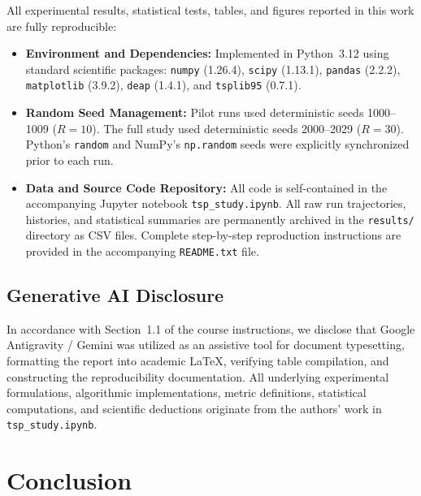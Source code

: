 \documentclass[10pt,a4paper]{article}
\begin{document}
All experimental results, statistical tests, tables, and figures reported in this work are fully reproducible:
\begin{itemize}
    \item \textbf{Environment and Dependencies:} Implemented in Python~3.12 using standard scientific packages: \texttt{numpy} (1.26.4), \texttt{scipy} (1.13.1), \texttt{pandas} (2.2.2), \texttt{matplotlib} (3.9.2), \texttt{deap} (1.4.1), and \texttt{tsplib95} (0.7.1).
    \item \textbf{Random Seed Management:} Pilot runs used deterministic seeds 1000--1009 ($R=10$). The full study used deterministic seeds 2000--2029 ($R=30$). Python's \texttt{random} and NumPy's \texttt{np.random} seeds were explicitly synchronized prior to each run.
    \item \textbf{Data and Source Code Repository:} All code is self-contained in the accompanying Jupyter notebook \texttt{tsp\_study.ipynb}. All raw run trajectories, histories, and statistical summaries are permanently archived in the \texttt{results/} directory as CSV files. Complete step-by-step reproduction instructions are provided in the accompanying \texttt{README.txt} file.
\end{itemize}

\subsection*{Generative AI Disclosure}
In accordance with Section~1.1 of the course instructions, we disclose that Google Antigravity / Gemini was utilized as an assistive tool for document typesetting, formatting the report into academic \LaTeX, verifying table compilation, and constructing the reproducibility documentation. All underlying experimental formulations, algorithmic implementations, metric definitions, statistical computations, and scientific deductions originate from the authors' work in \texttt{tsp\_study.ipynb}.

\section{Conclusion}
\label{sec:conclusion}
\end{document}
